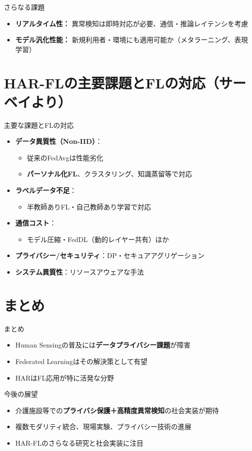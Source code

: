 \documentclass[unicode,12pt,aspectratio=169,dvipdfmx]{beamer}
\begin{document}
\begin{frame}{さらなる課題}
  \begin{itemize}
    \item \textbf{リアルタイム性：} 異常検知は即時対応が必要、通信・推論レイテンシを考慮
    \item \textbf{モデル汎化性能：} 新規利用者・環境にも適用可能か（メタラーニング、表現学習）
  \end{itemize}
\end{frame}


\section{HAR-FLの主要課題とFLの対応（サーベイより）}

\begin{frame}{主要な課題とFLの対応}
  \begin{itemize}
    \item \textbf{データ異質性（Non-IID）}：
      \begin{itemize}
        \item 従来のFedAvgは性能劣化
        \item \textbf{パーソナル化FL}、クラスタリング、知識蒸留等で対応
      \end{itemize}
    \item \textbf{ラベルデータ不足}：
      \begin{itemize}
        \item 半教師ありFL・自己教師あり学習で対応
      \end{itemize}
    \item \textbf{通信コスト}：
      \begin{itemize}
        \item モデル圧縮・FedDL（動的レイヤー共有）ほか
      \end{itemize}
    \item \textbf{プライバシー/セキュリティ}：DP・セキュアアグリゲーション
    \item \textbf{システム異質性}：リソースアウェアな手法
  \end{itemize}
\end{frame}

\section{まとめ}

\begin{frame}{まとめ}
  \begin{itemize}
    \item Human Sensingの普及には\textbf{データプライバシー課題}が障害
    \item Federated Learningはその解決策として有望
    \item HARはFL応用が特に活発な分野
  \end{itemize}
\end{frame}

\begin{frame}{今後の展望}
  \begin{itemize}
    \item 介護施設等での\textbf{プライバシ保護＋高精度異常検知}の社会実装が期待
    \item 複数モダリティ統合、現場実験、プライバシー技術の進展
    \item HAR-FLのさらなる研究と社会実装に注目
  \end{itemize}
\end{frame}
\end{document}
